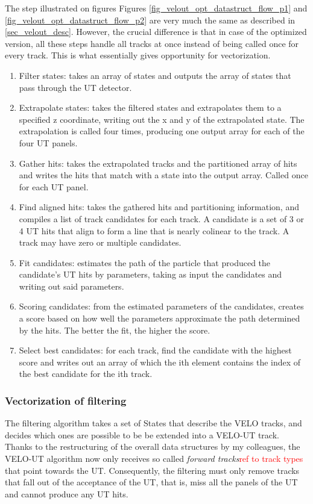 \documentclass[12pt]{article}
\begin{document}
The step illustrated on figures Figures \ref{fig_velout_opt_datastruct_flow_p1} and \ref{fig_velout_opt_datastruct_flow_p2} are very much the same as described in \ref{sec_velout_desc}. However, the crucial difference is that in case of the optimized version, all these steps handle all tracks at once instead of being called once for every track. This is what essentially gives opportunity for vectorization.

\begin{enumerate}
	\item Filter states: takes an array of states and outputs the array of states that pass through the UT detector.
	\item Extrapolate states: takes the filtered states and extrapolates them to a specified z coordinate, writing out the x and y of the extrapolated state. The extrapolation is called four times, producing one output array for each of the four UT panels.
	\item Gather hits: takes the extrapolated tracks and the partitioned array of hits and writes the hits that match with a state into the output array. Called once for each UT panel.
	\item Find aligned hits: takes the gathered hits and partitioning information, and compiles a list of track candidates for each track. A candidate is a set of 3 or 4 UT hits that align to form a line that is nearly colinear to the track. A track may have zero or multiple candidates.
	\item Fit candidates: estimates the path of the particle that produced the candidate's UT hits by parameters, taking as input the candidates and writing out said parameters.
	\item Scoring candidates: from the estimated parameters of the candidates, creates a score based on how well the parameters approximate the path determined by the hits. The better the fit, the higher the score.
	\item Select best candidates: for each track, find the candidate with the highest score and writes out an array of which the ith element contains the index of the best candidate for the ith track.
\end{enumerate}


\subsubsection{Vectorization of filtering}\label{sec_velout_filtering_vect}

The filtering algorithm takes a set of States that describe the VELO tracks, and decides which ones are possible to be be extended into a VELO-UT track. Thanks to the restructuring of the overall data structures by my colleagues, the VELO-UT algorithm now only receives so called \textit{forward tracks}\textcolor{red}{ref to track types} that point towards the UT. Consequently, the filtering must only remove tracks that fall out of the acceptance of the UT, that is, miss all the panels of the UT and cannot produce any UT hits.
\end{document}
